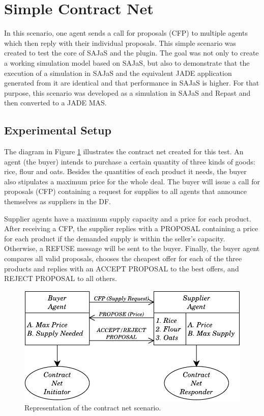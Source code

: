 \section{Simple Contract Net}

In this scenario, one agent sends a call for proposals (CFP) to multiple agents which then reply with their individual proposals. This simple scenario was created to test the core of SAJaS and the plugin. The goal was not only to create a working simulation model based on SAJaS, but also to demonstrate that the execution of a simulation in SAJaS and the equivalent JADE application generated from it are identical and that performance in SAJaS is higher. For that purpose, this scenario was developed as a simulation in SAJaS and Repast and then converted to a JADE MAS.

\subsection{Experimental Setup}

The diagram in Figure \ref{fig:CNetExample} illustrates the contract net created for this test. An agent (the buyer) intends to purchase a certain quantity of three kinds of goods: rice, flour and oats. Besides the quantities of each product it needs, the buyer also stipulates a maximum price for the whole deal. The buyer will issue a call for proposals (CFP) containing a request for supplies to all agents that announce themselves as suppliers in the DF.

Supplier agents have a maximum supply capacity and a price for each product. After receiving a CFP, the supplier replies with a PROPOSAL containing a price for each product if the demanded supply is within the seller's capacity. Otherwise, a REFUSE message will be sent to the buyer.
Finally, the buyer agent compares all valid proposals, chooses the cheapest offer for each of the three products and replies with an ACCEPT PROPOSAL to the best offers, and REJECT PROPOSAL to all others.

\begin{figure}
	\centering
	\includegraphics[width=0.60\linewidth]{figures/CNetExample.pdf}
	\caption{Representation of the contract net scenario.}
	\label{fig:CNetExample}
\end{figure}

